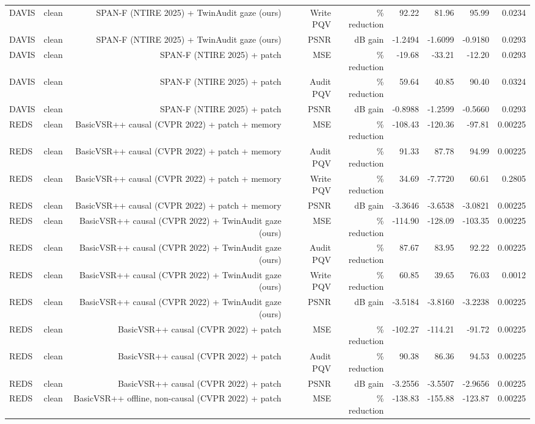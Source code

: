 \begin{table}[t]
\begin{tabular}{llrrrrrrr}
DAVIS & clean & SPAN-F (NTIRE 2025) + TwinAudit gaze (ours) & Write PQV & \% reduction & 92.22 & 81.96 & 95.99 & 0.0234 \\
DAVIS & clean & SPAN-F (NTIRE 2025) + TwinAudit gaze (ours) & PSNR & dB gain & -1.2494 & -1.6099 & -0.9180 & 0.0293 \\
DAVIS & clean & SPAN-F (NTIRE 2025) + patch & MSE & \% reduction & -19.68 & -33.21 & -12.20 & 0.0293 \\
DAVIS & clean & SPAN-F (NTIRE 2025) + patch & Audit PQV & \% reduction & 59.64 & 40.85 & 90.40 & 0.0324 \\
DAVIS & clean & SPAN-F (NTIRE 2025) + patch & PSNR & dB gain & -0.8988 & -1.2599 & -0.5660 & 0.0293 \\
REDS & clean & BasicVSR++ causal (CVPR 2022) + patch + memory & MSE & \% reduction & -108.43 & -120.36 & -97.81 & 0.00225 \\
REDS & clean & BasicVSR++ causal (CVPR 2022) + patch + memory & Audit PQV & \% reduction & 91.33 & 87.78 & 94.99 & 0.00225 \\
REDS & clean & BasicVSR++ causal (CVPR 2022) + patch + memory & Write PQV & \% reduction & 34.69 & -7.7720 & 60.61 & 0.2805 \\
REDS & clean & BasicVSR++ causal (CVPR 2022) + patch + memory & PSNR & dB gain & -3.3646 & -3.6538 & -3.0821 & 0.00225 \\
REDS & clean & BasicVSR++ causal (CVPR 2022) + TwinAudit gaze (ours) & MSE & \% reduction & -114.90 & -128.09 & -103.35 & 0.00225 \\
REDS & clean & BasicVSR++ causal (CVPR 2022) + TwinAudit gaze (ours) & Audit PQV & \% reduction & 87.67 & 83.95 & 92.22 & 0.00225 \\
REDS & clean & BasicVSR++ causal (CVPR 2022) + TwinAudit gaze (ours) & Write PQV & \% reduction & 60.85 & 39.65 & 76.03 & 0.0012 \\
REDS & clean & BasicVSR++ causal (CVPR 2022) + TwinAudit gaze (ours) & PSNR & dB gain & -3.5184 & -3.8160 & -3.2238 & 0.00225 \\
REDS & clean & BasicVSR++ causal (CVPR 2022) + patch & MSE & \% reduction & -102.27 & -114.21 & -91.72 & 0.00225 \\
REDS & clean & BasicVSR++ causal (CVPR 2022) + patch & Audit PQV & \% reduction & 90.38 & 86.36 & 94.53 & 0.00225 \\
REDS & clean & BasicVSR++ causal (CVPR 2022) + patch & PSNR & dB gain & -3.2556 & -3.5507 & -2.9656 & 0.00225 \\
REDS & clean & BasicVSR++ offline, non-causal (CVPR 2022) + patch & MSE & \% reduction & -138.83 & -155.88 & -123.87 & 0.00225 \\

\end{tabular}
\end{table}
